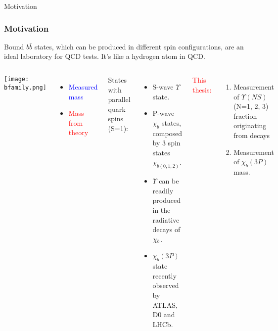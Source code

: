 \begin{frame}{Motivation}

\frametitle{Motivation}
Bound $b\bar{b}$ states, which can be produced in different spin
configurations, are an ideal laboratory for QCD tests. It's like a hydrogen
atom in QCD.
\begin{columns}[c]
\texttt{[image: bfamily.png]}
\begin{itemize}
  \item \textcolor{blue}{Measured mass}
  \item \textcolor{red}{Mass from theory}
\end{itemize}
\fontsize{9pt}{7.2}\selectfont
States with parallel quark spins (S=1):
\begin{itemize}
  \item S-wave $\Upsilon$ state.
  \item P-wave $\chi_{b}$ states, composed by 3 spin states $\chi_{b(0,1,2)}$. 
  \item $\Upsilon$ can be readily produced in the radiative decays of $\chi_{b}$.
  \item $\chi_{b}(3P)$ state recently observed by ATLAS, D0 and LHCb.
\end{itemize}
\textcolor{red}{This thesis:}
\begin{enumerate}
  \item Measurement of  $\Upsilon(NS)$ (N=1, 2, 3) fraction  originating from \chib decays
  \item Measurement of $\chi_{b}(3P)$ mass.
\end{enumerate}
\end{columns}

\end{frame}